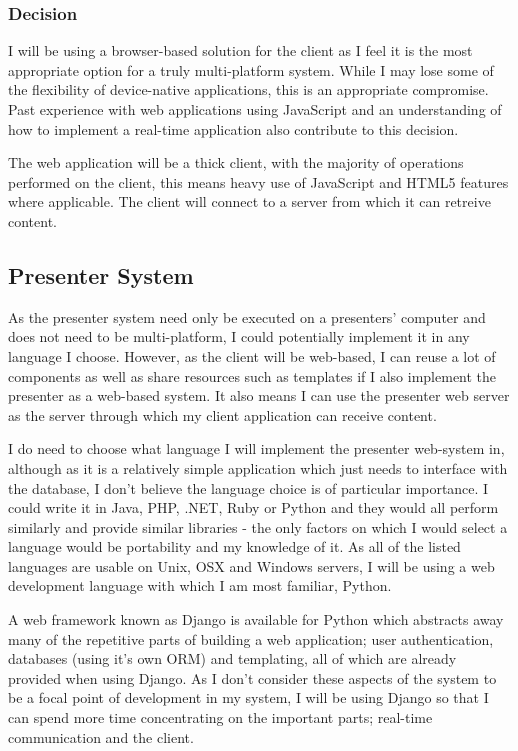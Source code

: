 \documentclass[a4papert,11pt,notitlepage]{ltxdoc}
\begin{document}
\subsubsection{Decision}
I will be using a browser-based solution for the client as I feel it is the most appropriate option for a truly multi-platform system. While I may lose some of the flexibility of device-native applications, this is an appropriate compromise. Past experience with web applications using JavaScript and an understanding of how to implement a real-time application also contribute to this decision.

The web application will be a thick client, with the majority of operations performed on the client, this means heavy use of JavaScript and HTML5 features where applicable. The client will connect to a server from which it can retreive content.

\subsection{Presenter System}
As the presenter system need only be executed on a presenters' computer and does not need to be multi-platform, I could potentially implement it in any language I choose. However, as the client will be web-based, I can reuse a lot of components as well as share resources such as templates if I also implement the presenter as a web-based system. It also means I can use the presenter web server as the server through which my client application can receive content.

I do need to choose what language I will implement the presenter web-system in, although as it is a relatively simple application which just needs to interface with the database, I don't believe the language choice is of particular importance. I could write it in Java, PHP, .NET, Ruby or Python and they would all perform similarly and provide similar libraries - the only factors on which I would select a language would be portability and my knowledge of it. As all of the listed languages are usable on Unix, OSX and Windows servers, I will be using a web development language with which I am most familiar, Python.

A web framework known as Django is available for Python which abstracts away many of the repetitive parts of building a web application; user authentication, databases (using it's own ORM) and templating, all of which are already provided when using Django. As I don't consider these aspects of the system to be a focal point of development in my system, I will be using Django so that I can spend more time concentrating on the important parts; real-time communication and the client.
\end{document}
